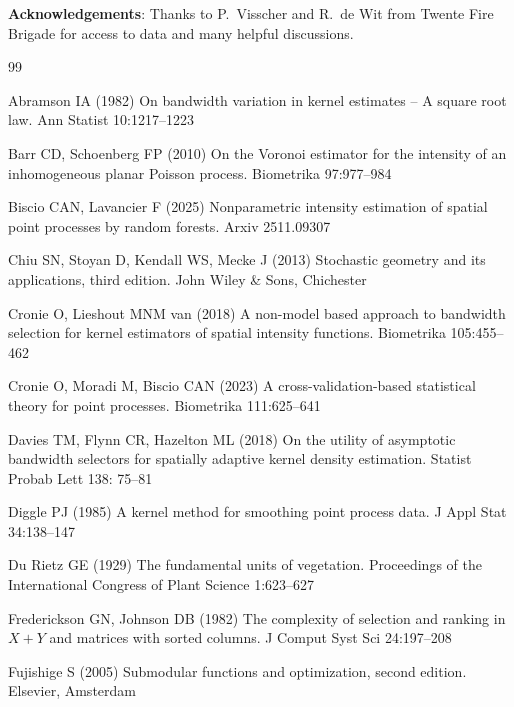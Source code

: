 \documentclass[twoside,11pt]{article}
\begin{document}
\bigskip 

\noindent
{\bf Acknowledgements}: Thanks to P.\ Visscher
and R.\ de Wit from Twente Fire Brigade for access to data and 
many helpful discussions.

\bigskip


\begin{thebibliography}{99}

Abramson IA (1982)
On bandwidth variation in kernel estimates -- A square root law.
Ann Statist 10:1217--1223

Barr CD, Schoenberg FP (2010)
On the Voronoi estimator for the intensity of an inhomogeneous
planar Poisson process. 
Biometrika 97:977–984

Biscio CAN, Lavancier F (2025)
Nonparametric intensity estimation of spatial point
processes by random forests.
Arxiv 2511.09307

Chiu SN, Stoyan D, Kendall WS, Mecke J (2013)
Stochastic geometry and its applications, third edition.
John Wiley \& Sons, Chichester
  
Cronie O, Lieshout MNM van (2018)
A non-model based approach to bandwidth selection for kernel
estimators of spatial intensity functions.
Biometrika 105:455--462

Cronie O, Moradi M, Biscio CAN (2023)
A cross-validation-based statistical theory for point processes.
Biometrika 111:625--641

Davies TM, Flynn CR, Hazelton ML (2018)
On the utility of asymptotic bandwidth selectors for
spatially adaptive kernel density estimation. 
Statist Probab Lett 138: 75–81

Diggle PJ (1985)
A kernel method for smoothing point process data.
J Appl Stat 34:138--147

Du Rietz GE (1929)
The fundamental units of vegetation. 
Proceedings of the International Congress
of Plant Science 1:623–627

Frederickson GN, Johnson DB (1982)
The complexity of selection and ranking in $X+Y$ and
matrices with sorted columns.
J Comput Syst Sci 24:197--208

Fujishige S (2005)
Submodular functions and optimization, second edition. 
Elsevier, Amsterdam


\end{thebibliography}
\end{document}
